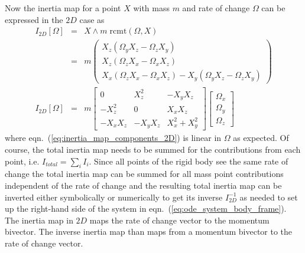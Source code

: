 Now the inertia map for a point $X$ with mass $m$ and rate of change $\Omega$ can be
expressed in the $2D$ case as
\begin{eqnarray}
    I_{2D}[\Omega] &=& X \wedge m \; \mathrm{rcmt}(\Omega,X) \nonumber \\[10pt]
    &=& m 
    \begin{pmatrix}
        X_z (\Omega_y X_z - \Omega_z X_y) \\
        X_z (\Omega_z X_x - \Omega_x X_z) \\
        X_x (\Omega_z X_x - \Omega_x X_z) - X_y (\Omega_y X_z - \Omega_z X_y)
    \end{pmatrix} \nonumber \\[10pt]
    I_{2D}[\Omega] &=& m
    \begin{bmatrix}
        0        &  X_z^2   & -X_y X_z      \\
        -X_z^2   &  0       &  X_x X_z      \\
        -X_x X_z & -X_y X_z & X_x^2 + X_y^2
    \end{bmatrix}
    \begin{bmatrix}
        \Omega_x \\ \Omega_y \\ \Omega_z
    \end{bmatrix}
    \label{eq:inertia_map_components_2D}      
\end{eqnarray}
where eqn.~(\ref{eq:inertia_map_components_2D}) is linear in $\Omega$ as expected. Of
course, the total inertia map needs to be summed for the contributions from each point,
i.e. $I_{total} = \sum_i{I_i}$. Since all points of the rigid body see the same rate of
change the total inertia map can be summed for all mass point contributions independent of
the rate of change and the resulting total inertia map can be inverted either symbolically
or numerically to get its inverse $I_{2D}^{-1}$ as needed to set up the right-hand side of
the system in eqn.~(\ref{eq:ode_system_body_frame}). The inertia map in $2D$ maps the rate
of change vector to the momentum bivector. The inverse inertia map than maps from a
momentum bivector to the rate of change vector.

